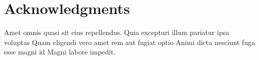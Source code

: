 \chapter*{Acknowledgments}
Amet omnis quasi sit eius repellendus. Quia excepturi illum pariatur ipsa
voluptas Quam eligendi vero amet rem aut fugiat optio Animi dicta nesciunt fuga
esse magni id Magni labore impedit.
